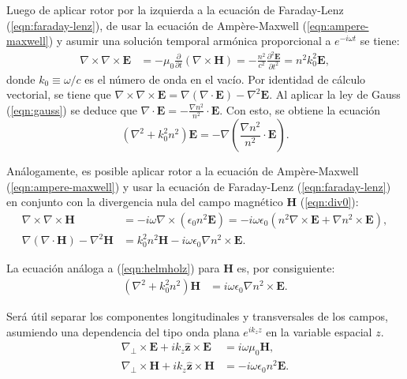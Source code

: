 Luego de aplicar rotor por la izquierda a la ecuación de Faraday-Lenz (\ref{eqn:faraday-lenz}), de usar la ecuación de Ampère-Maxwell (\ref{eqn:ampere-maxwell}) y asumir una solución temporal armónica proporcional a $e^{-i\omega t}$ se tiene:
\begin{align}
	\nabla\times\nabla\times\textbf{E} &= -\mu_0 \frac{\partial}{\partial t}(\nabla\times\textbf{H}) =  -\frac{n^2}{c^2}\frac{\partial^2 \textbf{E}}{\partial t^2} = n^2k_0^2 \textbf{E}, \label{eqn:rotordoble}
\end{align}
donde $k_0 \equiv \omega/c$ es el número de onda en el vacío. Por identidad de cálculo vectorial, se tiene que $\nabla\times\nabla\times\textbf{E} = \nabla(\nabla\cdot\textbf{E}) - \nabla^2\textbf{E}$. Al aplicar la ley de Gauss (\ref{eqn:gauss}) se deduce que $\nabla\cdot \textbf{E} = -\frac{\nabla n^2}{n^2}\cdot\textbf{E}$. Con esto, se obtiene la ecuación 
\begin{equation}
	\left(\nabla^2  + k_0^2n^2\right)\textbf{E} = -\nabla\left( \frac{\nabla n^2}{n^2} \cdot \textbf{E}  \right). \label{eqn:helmholz}
\end{equation}

Análogamente, es posible aplicar rotor a la ecuación de Ampère-Maxwell (\ref{eqn:ampere-maxwell}) y usar la ecuación de Faraday-Lenz (\ref{eqn:faraday-lenz}) en conjunto con la divergencia nula del campo magnético \textbf{H} (\ref{eqn:div0}):
\begin{align}
	\nabla\times\nabla\times \textbf{H} &= -i \omega \nabla\times\left(\epsilon_0 n^2 \textbf{E}\right) = -i\omega \epsilon_0  \left(n^2 \nabla\times \textbf{E} + \nabla n^2 \times \textbf{E}\right),
	\nonumber
	\\
	\nabla\left( {\nabla\cdot \textbf{H}} \right)- \nabla^2 \textbf{H}
	&= 
	  k_0^2 n^2\textbf{H} - i\omega \epsilon_0 \nabla n^2 \times \textbf{E} .
	 	\nonumber
\end{align}

La ecuación análoga a (\ref{eqn:helmholz}) para \textbf{H} es, por consiguiente:
\begin{align}
	 \left(\nabla^2  + k_0^2 n^2 \right) \textbf{H} &= i\omega \epsilon_0 \nabla n^2 \times \textbf{E}.
	 \label{eqn:helmholzH}
\end{align}

Será útil separar los componentes longitudinales y transversales de los campos, asumiendo una dependencia del tipo onda plana $e^{ik_z z}$ en la variable espacial $z$. 
\begin{align}
	\nabla_\perp \times  \textbf{E} + ik_z \hat{\textbf{z}} \times \textbf{E} &= i\omega\mu_0\textbf{H},
	\label{eqn:EfieldH}
	\\
	\nabla_\perp \times  \textbf{H} + ik_z \hat{\textbf{z}} \times \textbf{H} &= -i\omega \epsilon_0 n^2 \textbf{E}.
	\label{eqn:HfieldE}
\end{align}

